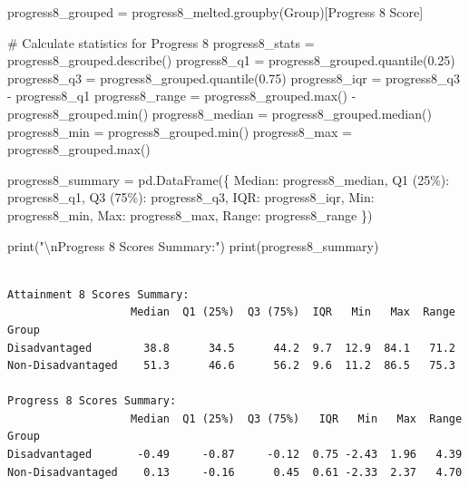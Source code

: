 \documentclass[
  letterpaper,
  DIV=11,
  numbers=noendperiod]{scrartcl}
\newenvironment{Shaded}{\begin{snugshade}}{\end{snugshade}}
\newcommand{\BuiltInTok}[1]{\textcolor[rgb]{0.00,0.23,0.31}{#1}}
\newcommand{\CharTok}[1]{\textcolor[rgb]{0.13,0.47,0.30}{#1}}
\newcommand{\CommentTok}[1]{\textcolor[rgb]{0.37,0.37,0.37}{#1}}
\newcommand{\FloatTok}[1]{\textcolor[rgb]{0.68,0.00,0.00}{#1}}
\newcommand{\NormalTok}[1]{\textcolor[rgb]{0.00,0.23,0.31}{#1}}
\newcommand{\OperatorTok}[1]{\textcolor[rgb]{0.37,0.37,0.37}{#1}}
\newcommand{\StringTok}[1]{\textcolor[rgb]{0.13,0.47,0.30}{#1}}
\begin{document}
\begin{Shaded}
\begin{Highlighting}[]
\NormalTok{progress8\_grouped }\OperatorTok{=}\NormalTok{ progress8\_melted.groupby(}\StringTok{\textquotesingle{}Group\textquotesingle{}}\NormalTok{)[}\StringTok{\textquotesingle{}Progress 8 Score\textquotesingle{}}\NormalTok{]}

\CommentTok{\# Calculate statistics for Progress 8}
\NormalTok{progress8\_stats }\OperatorTok{=}\NormalTok{ progress8\_grouped.describe()}
\NormalTok{progress8\_q1 }\OperatorTok{=}\NormalTok{ progress8\_grouped.quantile(}\FloatTok{0.25}\NormalTok{)}
\NormalTok{progress8\_q3 }\OperatorTok{=}\NormalTok{ progress8\_grouped.quantile(}\FloatTok{0.75}\NormalTok{)}
\NormalTok{progress8\_iqr }\OperatorTok{=}\NormalTok{ progress8\_q3 }\OperatorTok{{-}}\NormalTok{ progress8\_q1}
\NormalTok{progress8\_range }\OperatorTok{=}\NormalTok{ progress8\_grouped.}\BuiltInTok{max}\NormalTok{() }\OperatorTok{{-}}\NormalTok{ progress8\_grouped.}\BuiltInTok{min}\NormalTok{()}
\NormalTok{progress8\_median }\OperatorTok{=}\NormalTok{ progress8\_grouped.median()}
\NormalTok{progress8\_min }\OperatorTok{=}\NormalTok{ progress8\_grouped.}\BuiltInTok{min}\NormalTok{()}
\NormalTok{progress8\_max }\OperatorTok{=}\NormalTok{ progress8\_grouped.}\BuiltInTok{max}\NormalTok{()}


\NormalTok{progress8\_summary }\OperatorTok{=}\NormalTok{ pd.DataFrame(\{}
    \StringTok{\textquotesingle{}Median\textquotesingle{}}\NormalTok{: progress8\_median,}
    \StringTok{\textquotesingle{}Q1 (25\%)\textquotesingle{}}\NormalTok{: progress8\_q1,}
    \StringTok{\textquotesingle{}Q3 (75\%)\textquotesingle{}}\NormalTok{: progress8\_q3,}
    \StringTok{\textquotesingle{}IQR\textquotesingle{}}\NormalTok{: progress8\_iqr,}
    \StringTok{\textquotesingle{}Min\textquotesingle{}}\NormalTok{: progress8\_min,}
    \StringTok{\textquotesingle{}Max\textquotesingle{}}\NormalTok{: progress8\_max,}
    \StringTok{\textquotesingle{}Range\textquotesingle{}}\NormalTok{: progress8\_range}
\NormalTok{\})}


\BuiltInTok{print}\NormalTok{(}\StringTok{"}\CharTok{\textbackslash{}n}\StringTok{Progress 8 Scores Summary:"}\NormalTok{)}
\BuiltInTok{print}\NormalTok{(progress8\_summary)}
\end{Highlighting}
\end{Shaded}

\begin{verbatim}

Attainment 8 Scores Summary:
                   Median  Q1 (25%)  Q3 (75%)  IQR   Min   Max  Range
Group                                                                
Disadvantaged        38.8      34.5      44.2  9.7  12.9  84.1   71.2
Non-Disadvantaged    51.3      46.6      56.2  9.6  11.2  86.5   75.3

Progress 8 Scores Summary:
                   Median  Q1 (25%)  Q3 (75%)   IQR   Min   Max  Range
Group                                                                 
Disadvantaged       -0.49     -0.87     -0.12  0.75 -2.43  1.96   4.39
Non-Disadvantaged    0.13     -0.16      0.45  0.61 -2.33  2.37   4.70
\end{verbatim}
\end{document}
